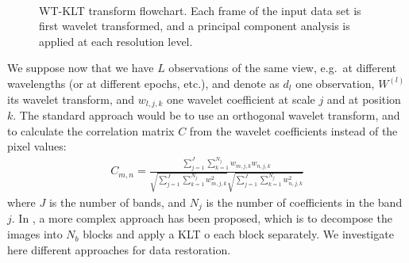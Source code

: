 \begin{figure}[htb]
\centerline{
\vbox{
\hbox{ 
}
}}
\caption{WT-KLT transform flowchart. Each frame of the input data set is first wavelet
transformed, and a principal component analysis is applied at each resolution
level.}
\label{fig_wtpca}
\end{figure}

We suppose now that we have $L$ observations of the same view, e.g.\
at different wavelengths (or at different epochs, etc.), and denote 
as $d_l$ one 
observation, $W^{(l)}$ its wavelet transform, and $w_{l,j,k}$ one wavelet
coefficient at scale $j$ and at position $k$. 
The standard approach would be to use an orthogonal wavelet transform, and
to calculate the correlation matrix $C$ from the wavelet coefficients instead
of the pixel values:
\begin{eqnarray}
C_{m,n} =  
 \frac{\sum_{j=1}^{J} \sum_{k=1}^{N_j} w_{m,j,k} w_{n,j,k}}
                      {\sqrt{\sum_{j=1}^{J} \sum_{k=1}^{N_j} w^2_{m,j,k}} \sqrt{\sum_{j=1}^{J} \sum_{k=1}^{N_j} w^2_{n,j,k}}}
\label{Correlation_matrix1}
\end{eqnarray}
where $J$ is the number of bands, and $N_j$ is the number of coefficients
in the band $j$.
In \cite{mc:lee99}, a more complex approach has been
proposed, which  is to decompose the images into $N_b$ blocks and 
apply a KLT o each block separately.  
We investigate here different approaches for data restoration.


